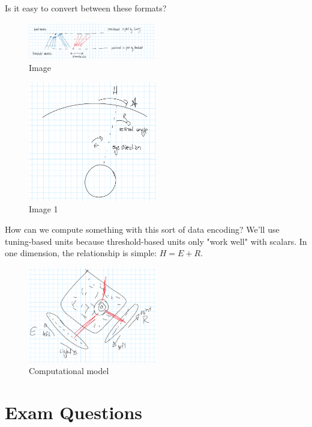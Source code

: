 \documentclass{article}
\begin{document}
Is it easy to convert between these formats?

\begin{figure}[H]
\centering
\includegraphics[width=0.5\textwidth]{assets/image.png}
\caption{Image}
\end{figure}

\begin{figure}[H]
\centering
\includegraphics[width=0.5\textwidth]{assets/image-1.png}
\caption{Image 1}
\end{figure}

How can we compute something with this sort of data encoding? We'll use tuning-based units because threshold-based units only "work well" with scalars. In one dimension, the relationship is simple: \(H = E + R\).

\begin{figure}[H]
\centering
\includegraphics[width=0.5\textwidth]{assets/image-2.png}
\caption{Computational model}
\end{figure}

\section{Exam Questions}
\end{document}
